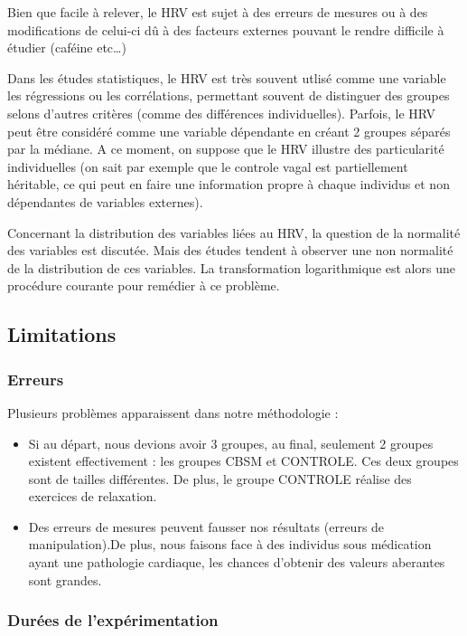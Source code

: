 \documentclass[]{article}
\providecommand{\tightlist}{%
  \setlength{\itemsep}{0pt}\setlength{\parskip}{0pt}}
\begin{document}
Bien que facile à relever, le HRV est sujet à des erreurs de mesures ou
à des modifications de celui-ci dû à des facteurs externes pouvant le
rendre difficile à étudier (caféine etc\ldots{})

Dans les études statistiques, le HRV est très souvent utlisé comme une
variable les régressions ou les corrélations, permettant souvent de
distinguer des groupes selons d'autres critères (comme des différences
individuelles). Parfois, le HRV peut être considéré comme une variable
dépendante en créant 2 groupes séparés par la médiane. A ce moment, on
suppose que le HRV illustre des particularité individuelles (on sait par
exemple que le controle vagal est partiellement héritable, ce qui peut
en faire une information propre à chaque individus et non dépendantes de
variables externes).

Concernant la distribution des variables liées au HRV, la question de la
normalité des variables est discutée. Mais des études tendent à observer
une non normalité de la distribution de ces variables. La transformation
logarithmique est alors une procédure courante pour remédier à ce
problème.

\hypertarget{limitations}{%
\subsection{Limitations}\label{limitations}}

\hypertarget{erreurs}{%
\subsubsection{Erreurs}\label{erreurs}}

Plusieurs problèmes apparaissent dans notre méthodologie :

\begin{itemize}
\tightlist
\item
  Si au départ, nous devions avoir 3 groupes, au final, seulement 2
  groupes existent effectivement : les groupes CBSM et CONTROLE. Ces
  deux groupes sont de tailles différentes. De plus, le groupe CONTROLE
  réalise des exercices de relaxation.
\item
  Des erreurs de mesures peuvent fausser nos résultats (erreurs de
  manipulation).De plus, nous faisons face à des individus sous
  médication ayant une pathologie cardiaque, les chances d'obtenir des
  valeurs aberantes sont grandes.
\end{itemize}

\hypertarget{durees-de-lexperimentation}{%
\subsubsection{Durées de
l'expérimentation}\label{durees-de-lexperimentation}}
\end{document}
